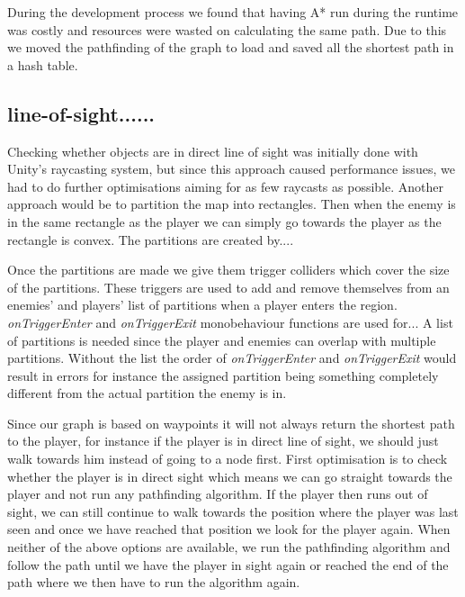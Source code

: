 During the development process we found that having A* run during the runtime was costly and resources were wasted on calculating the same path.
Due to this we moved the pathfinding of the graph to load and saved all the shortest path in a hash table.



\subsection{line-of-sight......}
Checking whether objects are in direct line of sight was initially done with Unity's raycasting system, but since this approach caused performance issues, we had to do further optimisations aiming for as few raycasts as possible.
Another approach would be to partition the map into rectangles.
Then when the enemy is in the same rectangle as the player we can simply go towards the player as the rectangle is convex.
The partitions are created by.... 

Once the partitions are made we give them trigger colliders which cover the size of the partitions.
These triggers are used to add and remove themselves from an enemies' and players' list of partitions when a player enters the region.
\textit{onTriggerEnter} and \textit{onTriggerExit} monobehaviour functions are used for...
A list of partitions is needed since the player and enemies can overlap with multiple partitions.
Without the list the order of \textit{onTriggerEnter} and \textit{onTriggerExit} would result in errors for instance the assigned partition being something completely different from the actual partition the enemy is in.



Since our graph is based on waypoints it will not always return the shortest path to the player, for instance if the player is in direct line of sight, we should just walk towards him instead of going to a node first.
First optimisation is to check whether the player is in direct sight which means we can go straight towards the player and not run any pathfinding algorithm.
If the player then runs out of sight, we can still continue to walk towards the position where the player was last seen and once we have reached that position we look for the player again.
When neither of the above options are available, we run the pathfinding algorithm and follow the path until we have the player in sight again or reached the end of the path where we then have to run the algorithm again.

